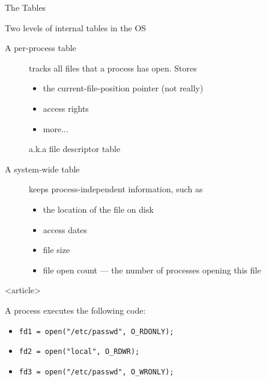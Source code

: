 \begin{frame}{The Tables}%
  \begin{block}{Two levels of internal tables in the OS}
    \begin{description}
      \item[A per-process table] tracks all files that a process has open. Stores
        \begin{itemize}
        \item the current-file-position pointer (not really)
        \item access rights
        \item more...
        \end{itemize}
        a.k.a file descriptor table
      \item[A system-wide table] keeps process-independent information, such as
        \begin{itemize}
        \item the location of the file on disk
        \item access dates
        \item file size
        \item file open count --- the number of processes opening this file
        \end{itemize}
    \end{description}    
  \end{block}  
\end{frame}

\begin{frame}<article>%
  \begin{center}
  \end{center}
\end{frame}

\begin{frame}
  \begin{block}{A process executes the following code:}
    \begin{itemize}
    \item[] \texttt{fd1 = open("/etc/passwd", O\_RDONLY);}
    \item[] \texttt{fd2 = open("local", O\_RDWR);}
    \item[] \texttt{fd3 = open("/etc/passwd", O\_WRONLY);}
    \end{itemize}
  \end{block}
  \centering
\end{frame}

